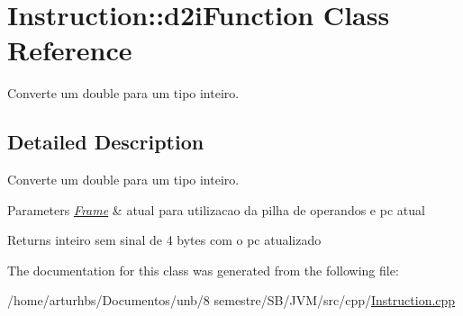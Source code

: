 \hypertarget{classInstruction_1_1d2iFunction}{}\section{Instruction\+:\+:d2i\+Function Class Reference}
\label{classInstruction_1_1d2iFunction}


Converte um double para um tipo inteiro.  




\subsection{Detailed Description}
Converte um double para um tipo inteiro. 


\begin{DoxyParams}{Parameters}
{\em \hyperlink{classFrame}{Frame}} & atual para utilizacao da pilha de operandos e pc atual \\
\hline
\end{DoxyParams}
\begin{DoxyReturn}{Returns}
inteiro sem sinal de 4 bytes com o pc atualizado 
\end{DoxyReturn}


The documentation for this class was generated from the following file\+:\begin{DoxyCompactItemize}
\item 
/home/arturhbs/\+Documentos/unb/8 semestre/\+S\+B/\+J\+V\+M/src/cpp/\hyperlink{Instruction_8cpp}{Instruction.\+cpp}\end{DoxyCompactItemize}
